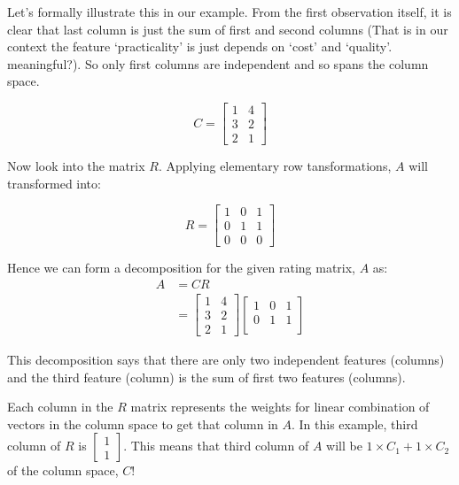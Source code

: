 \documentclass[
  letterpaper,
  DIV=11,
  numbers=noendperiod]{scrreprt}
\theoremstyle{plain}
\theoremstyle{definition}
\theoremstyle{remark}
\begin{document}
Let's formally illustrate this in our example. From the first
observation itself, it is clear that last column is just the sum of
first and second columns (That is in our context the feature
`practicality' is just depends on `cost' and `quality'. meaningful?). So
only first columns are independent and so spans the column space.

\[C=\begin{bmatrix}1&4\\3&2\\2&1\end{bmatrix}\]

Now look into the matrix \(R\). Applying elementary row tansformations,
\(A\) will transformed into:

\[R=\begin{bmatrix}1&0&1\\0&1&1\\0&0&0\end{bmatrix}\]

Hence we can form a decomposition for the given rating matrix, \(A\) as:
\begin{align*}
A&=CR\\
&=\begin{bmatrix}1&4\\3&2\\2&1\end{bmatrix}\begin{bmatrix}1&0&1\\0&1&1\\\mbox{}&&\end{bmatrix}
\end{align*}

This decomposition says that there are only two independent features
(columns) and the third feature (column) is the sum of first two
features (columns).

\begin{tcolorbox}[enhanced jigsaw, rightrule=.15mm, arc=.35mm, breakable, colback=white, toprule=.15mm, colframe=quarto-callout-important-color-frame, toptitle=1mm, opacityback=0, colbacktitle=quarto-callout-important-color!10!white, opacitybacktitle=0.6, title=\textcolor{quarto-callout-important-color}{\faExclamation}\hspace{0.5em}{Interpretation of the \(R\) matrix}, bottomrule=.15mm, left=2mm, titlerule=0mm, coltitle=black, bottomtitle=1mm, leftrule=.75mm]

Each column in the \(R\) matrix represents the weights for linear
combination of vectors in the column space to get that column in \(A\).
In this example, third column of \(R\) is
\(\begin{bmatrix}1\\1\end{bmatrix}\). This means that third column of
\(A\) will be \(1\times C_1+1\times C_2\) of the column space, \(C\)!

\end{tcolorbox}
\end{document}
